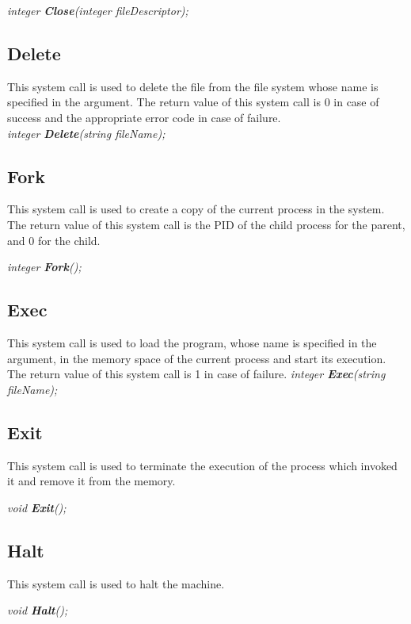 \textit{integer \textbf{Close}(integer fileDescriptor);}




\subsection{Delete}
This system call is used to delete the file from the file system whose name is specified in the
argument. The return value of this system call is 0 in case of success and the appropriate error code in case
of failure.\\

\textit{integer \textbf{Delete}(string fileName);}



\subsection{Fork}
This system call is used to create a copy of the current process in the system. The return value of this system call is the PID of the child process for the parent, and 0 for the child.


\textit{integer \textbf{Fork}();}




\subsection{Exec}
This system call is used to load the program, whose name is specified in the argument, in the
memory space of the current process and start its execution. The return value of this system call is 1 in case of failure.
\textit{integer \textbf{Exec}(string fileName);}




\subsection{Exit}
This system call is used to terminate the execution of the process which invoked it and remove it from the memory.

\textit{void \textbf{Exit}();}


\subsection{Halt}
This system call is used to halt the machine.

\textit{void \textbf{Halt}();}

%
